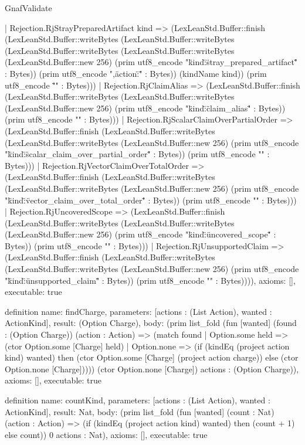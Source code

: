 \begin{lexlean}{GnafValidate}
\begin{semanticmodule}
{    | Rejection.RjStrayPreparedArtifact kind => (LexLeanStd.Buffer::finish (LexLeanStd.Buffer::writeBytes (LexLeanStd.Buffer::writeBytes (LexLeanStd.Buffer::writeBytes (LexLeanStd.Buffer::writeBytes (LexLeanStd.Buffer::new 256) (prim utf8_encode "{\"kind\":\"stray_prepared_artifact\"" : Bytes)) (prim utf8_encode ",\"action\":\"" : Bytes)) (kindName kind)) (prim utf8_encode "\"}" : Bytes)))
    | Rejection.RjClaimAlias => (LexLeanStd.Buffer::finish (LexLeanStd.Buffer::writeBytes (LexLeanStd.Buffer::writeBytes (LexLeanStd.Buffer::new 256) (prim utf8_encode "{\"kind\":\"claim_alias\"" : Bytes)) (prim utf8_encode "}" : Bytes)))
    | Rejection.RjScalarClaimOverPartialOrder => (LexLeanStd.Buffer::finish (LexLeanStd.Buffer::writeBytes (LexLeanStd.Buffer::writeBytes (LexLeanStd.Buffer::new 256) (prim utf8_encode "{\"kind\":\"scalar_claim_over_partial_order\"" : Bytes)) (prim utf8_encode "}" : Bytes)))
    | Rejection.RjVectorClaimOverTotalOrder => (LexLeanStd.Buffer::finish (LexLeanStd.Buffer::writeBytes (LexLeanStd.Buffer::writeBytes (LexLeanStd.Buffer::new 256) (prim utf8_encode "{\"kind\":\"vector_claim_over_total_order\"" : Bytes)) (prim utf8_encode "}" : Bytes)))
    | Rejection.RjUncoveredScope => (LexLeanStd.Buffer::finish (LexLeanStd.Buffer::writeBytes (LexLeanStd.Buffer::writeBytes (LexLeanStd.Buffer::new 256) (prim utf8_encode "{\"kind\":\"uncovered_scope\"" : Bytes)) (prim utf8_encode "}" : Bytes)))
    | Rejection.RjUnsupportedClaim => (LexLeanStd.Buffer::finish (LexLeanStd.Buffer::writeBytes (LexLeanStd.Buffer::writeBytes (LexLeanStd.Buffer::new 256) (prim utf8_encode "{\"kind\":\"unsupported_claim\"" : Bytes)) (prim utf8_encode "}" : Bytes)))),
  axioms: [],
  executable: true
}

definition{
  name: findCharge,
  parameters: [actions : (List Action), wanted : ActionKind],
  result: (Option Charge),
  body: (prim list_fold (fun [wanted] (found : (Option Charge)) (action : Action) => (match found
    | Option.some held => (ctor Option.some [Charge] held)
    | Option.none => (if (kindEq (project action kind) wanted) then (ctor Option.some [Charge] (project action charge)) else (ctor Option.none [Charge])))) (ctor Option.none [Charge]) actions : (Option Charge)),
  axioms: [],
  executable: true
}

definition{
  name: countKind,
  parameters: [actions : (List Action), wanted : ActionKind],
  result: Nat,
  body: (prim list_fold (fun [wanted] (count : Nat) (action : Action) => (if (kindEq (project action kind) wanted) then (count + 1) else count)) 0 actions : Nat),
  axioms: [],
  executable: true
}


\end{semanticmodule}
\end{lexlean}
